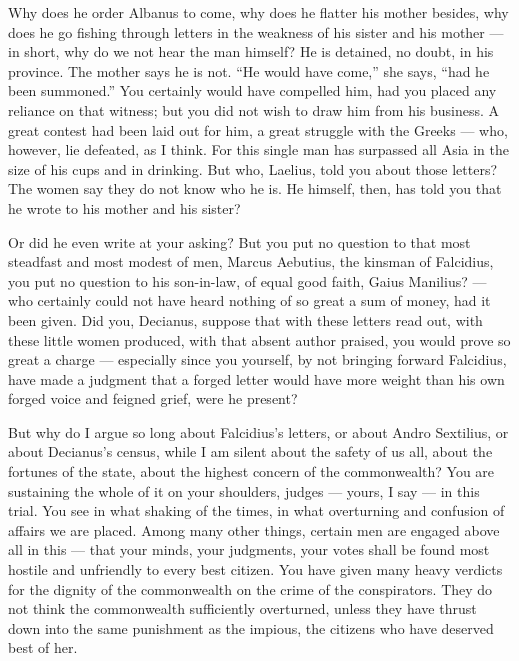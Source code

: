  Why does he order Albanus to come, why does he flatter his mother besides, why does he go fishing through letters in the weakness of his sister and his mother --- in short, why do we not hear the man himself? He is detained, no doubt, in his province. The mother says he is not. ``He would have come,'' she says, ``had he been summoned.'' You certainly would have compelled him, had you placed any reliance on that witness; but you did not wish to draw him from his business. A great contest had been laid out for him, a great struggle with the Greeks --- who, however, lie defeated, as I think. For this single man has surpassed all Asia in the size of his cups and in drinking. But who, Laelius, told you about those letters? The women say they do not know who he is. He himself, then, has told you that he wrote to his mother and his sister?

 Or did he even write at your asking? But you put no question to that most steadfast and most modest of men, Marcus Aebutius, the kinsman of Falcidius, you put no question to his son-in-law, of equal good faith, Gaius Manilius? --- who certainly could not have heard nothing of so great a sum of money, had it been given. Did you, Decianus, suppose that with these letters read out, with these little women produced, with that absent author praised, you would prove so great a charge --- especially since you yourself, by not bringing forward Falcidius, have made a judgment that a forged letter would have more weight than his own forged voice and feigned grief, were he present?

 But why do I argue so long about Falcidius's letters, or about Andro Sextilius, or about Decianus's census, while I am silent about the safety of us all, about the fortunes of the state, about the highest concern of the commonwealth? You are sustaining the whole of it on your shoulders, judges --- yours, I say --- in this trial. You see in what shaking of the times, in what overturning and confusion of affairs we are placed. Among many other things, certain men are engaged above all in this --- that your minds, your judgments, your votes shall be found most hostile and unfriendly to every best citizen. You have given many heavy verdicts for the dignity of the commonwealth on the crime of the conspirators. They do not think the commonwealth sufficiently overturned, unless they have thrust down into the same punishment as the impious, the citizens who have deserved best of her.

